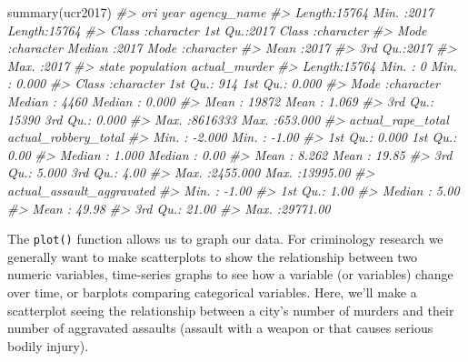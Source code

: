 \documentclass[
]{krantz}
\makeatletter
\newenvironment{Shaded}{\begin{snugshade}}{\end{snugshade}}
\newcommand{\CommentTok}[1]{\textcolor[rgb]{0.37,0.37,0.37}{\textit{#1}}}
\newcommand{\FunctionTok}[1]{\textcolor[rgb]{0,0,0}{#1}}
\newcommand{\NormalTok}[1]{#1}
\newenvironment{kframe}{%
\medskip{}
\setlength{\fboxsep}{.8em}
 \def\at@end@of@kframe{}%
 \ifinner\ifhmode%
  \def\at@end@of@kframe{\end{minipage}}%
  \begin{minipage}{\columnwidth}%
 \fi\fi%
 \def\FrameCommand##1{\hskip\@totalleftmargin \hskip-\fboxsep
 \colorbox{shadecolor}{##1}\hskip-\fboxsep
     \hskip-\linewidth \hskip-\@totalleftmargin \hskip\columnwidth}%
 \MakeFramed {\advance\hsize-\width
   \@totalleftmargin\z@ \linewidth\hsize
   \@setminipage}}%
 {\par\unskip\endMakeFramed%
 \at@end@of@kframe}
\renewenvironment{Shaded}{\begin{kframe}}{\end{kframe}}
\makeatother
\begin{document}
\begin{Shaded}
\begin{Highlighting}[]
\FunctionTok{summary}\NormalTok{(ucr2017)}
\CommentTok{\#\textgreater{}      ori                 year      agency\_name       }
\CommentTok{\#\textgreater{}  Length:15764       Min.   :2017   Length:15764      }
\CommentTok{\#\textgreater{}  Class :character   1st Qu.:2017   Class :character  }
\CommentTok{\#\textgreater{}  Mode  :character   Median :2017   Mode  :character  }
\CommentTok{\#\textgreater{}                     Mean   :2017                     }
\CommentTok{\#\textgreater{}                     3rd Qu.:2017                     }
\CommentTok{\#\textgreater{}                     Max.   :2017                     }
\CommentTok{\#\textgreater{}     state             population      actual\_murder    }
\CommentTok{\#\textgreater{}  Length:15764       Min.   :      0   Min.   :  0.000  }
\CommentTok{\#\textgreater{}  Class :character   1st Qu.:    914   1st Qu.:  0.000  }
\CommentTok{\#\textgreater{}  Mode  :character   Median :   4460   Median :  0.000  }
\CommentTok{\#\textgreater{}                     Mean   :  19872   Mean   :  1.069  }
\CommentTok{\#\textgreater{}                     3rd Qu.:  15390   3rd Qu.:  0.000  }
\CommentTok{\#\textgreater{}                     Max.   :8616333   Max.   :653.000  }
\CommentTok{\#\textgreater{}  actual\_rape\_total  actual\_robbery\_total}
\CommentTok{\#\textgreater{}  Min.   :  {-}2.000   Min.   :   {-}1.00    }
\CommentTok{\#\textgreater{}  1st Qu.:   0.000   1st Qu.:    0.00    }
\CommentTok{\#\textgreater{}  Median :   1.000   Median :    0.00    }
\CommentTok{\#\textgreater{}  Mean   :   8.262   Mean   :   19.85    }
\CommentTok{\#\textgreater{}  3rd Qu.:   5.000   3rd Qu.:    4.00    }
\CommentTok{\#\textgreater{}  Max.   :2455.000   Max.   :13995.00    }
\CommentTok{\#\textgreater{}  actual\_assault\_aggravated}
\CommentTok{\#\textgreater{}  Min.   :   {-}1.00         }
\CommentTok{\#\textgreater{}  1st Qu.:    1.00         }
\CommentTok{\#\textgreater{}  Median :    5.00         }
\CommentTok{\#\textgreater{}  Mean   :   49.98         }
\CommentTok{\#\textgreater{}  3rd Qu.:   21.00         }
\CommentTok{\#\textgreater{}  Max.   :29771.00}
\end{Highlighting}
\end{Shaded}

The \texttt{plot()} function allows us to graph our data.
For criminology research we generally want to make
scatterplots to show the relationship between two numeric
variables, time-series graphs to see how a variable (or
variables) change over time, or barplots comparing
categorical variables. Here, we'll make a scatterplot seeing
the relationship between a city's number of murders and
their number of aggravated assaults (assault with a weapon
or that causes serious bodily injury).
\end{document}
